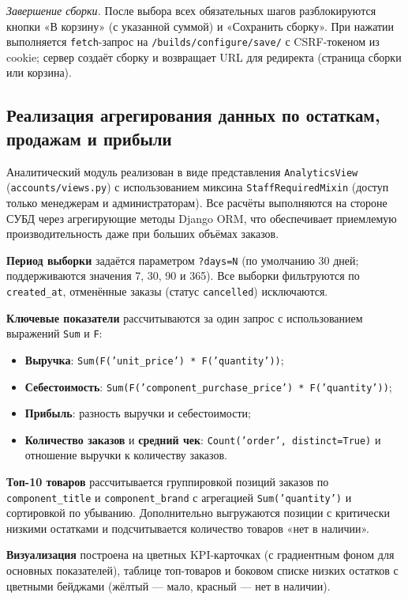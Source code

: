 \documentclass[14pt, a4paper]{extarticle}
\begin{document}
\emph{Завершение сборки.} После выбора всех обязательных шагов разблокируются кнопки «В корзину» (с указанной суммой) и «Сохранить сборку». При нажатии выполняется \texttt{fetch}-запрос на \texttt{/builds/configure/save/} с CSRF-токеном из cookie; сервер создаёт сборку и возвращает URL для редиректа (страница сборки или корзина).

\subsection{Реализация агрегирования данных по остаткам, продажам и прибыли}

Аналитический модуль реализован в виде представления \texttt{AnalyticsView} (\texttt{accounts/views.py}) с использованием миксина \texttt{StaffRequiredMixin} (доступ только менеджерам и администраторам). Все расчёты выполняются на стороне СУБД через агрегирующие методы Django ORM, что обеспечивает приемлемую производительность даже при больших объёмах заказов.

\textbf{Период выборки} задаётся параметром \texttt{?days=N} (по умолчанию 30 дней; поддерживаются значения 7, 30, 90 и 365). Все выборки фильтруются по \texttt{created\_at}, отменённые заказы (статус \texttt{cancelled}) исключаются.

\textbf{Ключевые показатели} рассчитываются за один запрос с использованием выражений \texttt{Sum} и \texttt{F}:
\begin{itemize}
    \item \textbf{Выручка}: \texttt{Sum(F('unit\_price') * F('quantity'))};
    \item \textbf{Себестоимость}: \texttt{Sum(F('component\_\allowbreak purchase\_price') * F('quantity'))};
    \item \textbf{Прибыль}: разность выручки и себестоимости;
    \item \textbf{Количество заказов} и \textbf{средний чек}: \texttt{Count('order', distinct=True)} и отношение выручки к количеству заказов.
\end{itemize}

\textbf{Топ-10 товаров} рассчитывается группировкой позиций заказов по \texttt{component\_\allowbreak title} и \texttt{component\_\allowbreak brand} с агрегацией \texttt{Sum('quantity')} и сортировкой по убыванию. Дополнительно выгружаются позиции с критически низкими остатками и подсчитывается количество товаров «нет в наличии».

\textbf{Визуализация} построена на цветных KPI-карточках (с градиентным фоном для основных показателей), таблице топ-товаров и боковом списке низких остатков с цветными бейджами (жёлтый --- мало, красный --- нет в наличии).
\end{document}
